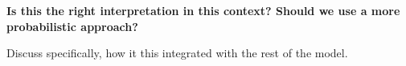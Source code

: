 \documentclass{article}
\begin{document}
{\bf Is this the right interpretation in this context? Should we use a
  more probabilistic approach?

Discuss specifically, how it this integrated with the rest of the
model. }

\end{document}
